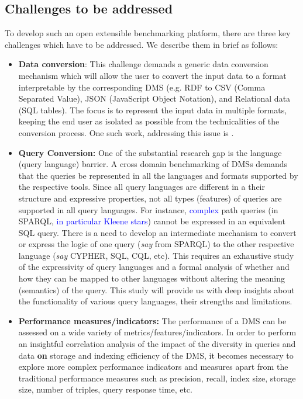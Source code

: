 \documentclass{llncs}
\begin{document}
    \subsection{Challenges to be addressed}\label{challenges}
        To develop such an open extensible benchmarking platform, there are three key challenges which have to be addressed. We describe them in brief as follows:
        \begin{itemize}[nosep]
            \item {} \textbf{Data conversion}: This challenge demands a generic data conversion mechanism which will allow the user to convert the input data to a format interpretable by the corresponding DMS (e.g. RDF to CSV (Comma Separated Value), JSON (JavaScript Object Notation),  and Relational data (SQL tables). The focus is to represent the input data in multiple formats, keeping the end user as isolated as possible from the technicalities of the conversion process. One such work, addressing this issue is \cite{attardexconquer}.
            \item {} \textbf{Query Conversion:} 
            One of the substantial research gap is the language (query language) barrier. A cross domain benchmarking of DMSs demands that the queries be represented in all the languages and formats supported by the respective tools. Since all query languages are different in a their structure and expressive properties, not all types (features) of queries are supported in all query languages. For instance, \textcolor{blue}{complex} path queries (in SPARQL, \textcolor{blue}{in particular Kleene stars}) cannot be expressed in an equivalent SQL query. There is a need to develop an intermediate mechanism to convert or express the logic of one query (\textit{say} from SPARQL) to the other respective language (\textit{say} CYPHER, SQL, CQL, etc). This requires an exhaustive study of the expressivity of query languages and a formal analysis of whether and how they can be mapped to other languages without altering the meaning (semantics) of the query. This study will provide us with deep insights about the functionality of various query languages, their strengths and limitations.
            \item {} \textbf{Performance measures/indicators:} 
            The performance of a DMS can be assessed on a wide variety of metrics/features/indicators. In order to perform an insightful correlation analysis of the impact of the diversity in queries and data \textbf{on} storage and indexing efficiency of the DMS, it becomes necessary to explore more complex performance indicators and measures apart from the traditional performance measures such as precision, recall, index size, storage size, number of triples, query response time, etc.
        \end{itemize}
    
\end{document}
